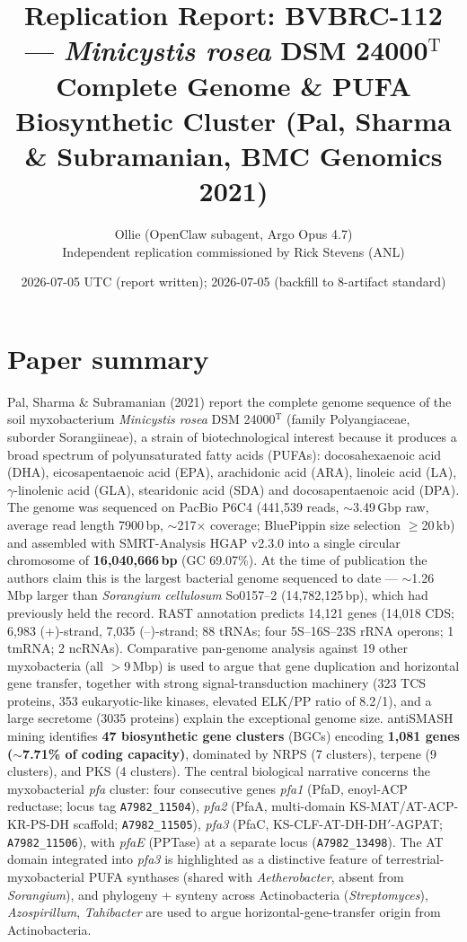 \documentclass[11pt,letterpaper]{article}
\title{Replication Report: BVBRC-112 --- \emph{Minicystis rosea} DSM 24000$^{\mathrm{T}}$ Complete Genome \& PUFA Biosynthetic Cluster (Pal, Sharma \& Subramanian, BMC Genomics 2021)}
\author{Ollie (OpenClaw subagent, Argo Opus 4.7) \\ Independent replication commissioned by Rick Stevens (ANL)}
\date{2026-07-05 UTC (report written); 2026-07-05 (backfill to 8-artifact standard)}
\begin{document}
\maketitle

\section{Paper summary}

Pal, Sharma \& Subramanian (2021) report the complete genome sequence of the soil myxobacterium \emph{Minicystis rosea} DSM 24000$^{\mathrm{T}}$ (family Polyangiaceae, suborder Sorangiineae), a strain of biotechnological interest because it produces a broad spectrum of polyunsaturated fatty acids (PUFAs): docosahexaenoic acid (DHA), eicosapentaenoic acid (EPA), arachidonic acid (ARA), linoleic acid (LA), $\gamma$-linolenic acid (GLA), stearidonic acid (SDA) and docosapentaenoic acid (DPA). The genome was sequenced on PacBio P6C4 (441{,}539 reads, $\sim$3.49\,Gbp raw, average read length 7900\,bp, $\sim$217$\times$ coverage; BluePippin size selection $\geq$20\,kb) and assembled with SMRT-Analysis HGAP v2.3.0 into a single circular chromosome of \textbf{16{,}040{,}666\,bp} (GC 69.07\%). At the time of publication the authors claim this is the largest bacterial genome sequenced to date --- $\sim$1.26\,Mbp larger than \emph{Sorangium cellulosum} So0157--2 (14{,}782{,}125\,bp), which had previously held the record. RAST annotation predicts 14{,}121 genes (14{,}018 CDS; 6{,}983 (+)-strand, 7{,}035 (--)-strand; 88 tRNAs; four 5S--16S--23S rRNA operons; 1 tmRNA; 2 ncRNAs). Comparative pan-genome analysis against 19 other myxobacteria (all $>$9\,Mbp) is used to argue that gene duplication and horizontal gene transfer, together with strong signal-transduction machinery (323 TCS proteins, 353 eukaryotic-like kinases, elevated ELK/PP ratio of 8.2/1), and a large secretome (3035 proteins) explain the exceptional genome size. antiSMASH mining identifies \textbf{47 biosynthetic gene clusters} (BGCs) encoding \textbf{1{,}081 genes ($\sim$7.71\% of coding capacity)}, dominated by NRPS (7 clusters), terpene (9 clusters), and PKS (4 clusters). The central biological narrative concerns the myxobacterial \emph{pfa} cluster: four consecutive genes \emph{pfa1} (PfaD, enoyl-ACP reductase; locus tag \texttt{A7982\_11504}), \emph{pfa2} (PfaA, multi-domain KS-MAT/AT-ACP-KR-PS-DH scaffold; \texttt{A7982\_11505}), \emph{pfa3} (PfaC, KS-CLF-AT-DH-DH$'$-AGPAT; \texttt{A7982\_11506}), with \emph{pfaE} (PPTase) at a separate locus (\texttt{A7982\_13498}). The AT domain integrated into \emph{pfa3} is highlighted as a distinctive feature of terrestrial-myxobacterial PUFA synthases (shared with \emph{Aetherobacter}, absent from \emph{Sorangium}), and phylogeny + synteny across Actinobacteria (\emph{Streptomyces}), \emph{Azospirillum}, \emph{Tahibacter} are used to argue horizontal-gene-transfer origin from Actinobacteria.
\end{document}
